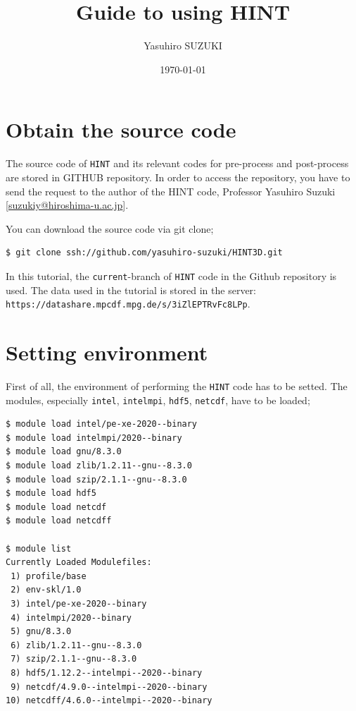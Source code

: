 \documentclass[10pt]{ltxdoc} %
\title{Guide to using HINT}
\author{Yasuhiro SUZUKI}
\date{\today} %
\begin{document}
\maketitle

\section{Obtain the source code}
The source code of \texttt{HINT} and its relevant codes for pre-process and post-process are stored in GITHUB repository. In order to access the repository, you have to send the request to the author of the HINT code, Professor Yasuhiro Suzuki [\href{mailto:suzukiy@hiroshima-u.ac.jp}{suzukiy@hiroshima-u.ac.jp}].

\vspace{5mm}
You can download the source code via git clone;
\begin{verbatim}
$ git clone ssh://github.com/yasuhiro-suzuki/HINT3D.git
\end{verbatim}
\vspace{5mm}

In this tutorial, the \texttt{current}-branch of \texttt{HINT} code in the Github repository is used. 
The data used in the tutorial is stored in the server: \texttt{https://datashare.mpcdf.mpg.de/s/3iZlEPTRvFc8LPp}.

\section{Setting environment}
First of all, the environment of performing the \texttt{HINT} code has to be setted. 
The modules, especially \texttt{intel}, \texttt{intelmpi}, \texttt{hdf5}, \texttt{netcdf}, have to be loaded; 
\vspace{3mm}
\begin{verbatim}
$ module load intel/pe-xe-2020--binary
$ module load intelmpi/2020--binary
$ module load gnu/8.3.0
$ module load zlib/1.2.11--gnu--8.3.0
$ module load szip/2.1.1--gnu--8.3.0
$ module load hdf5
$ module load netcdf
$ module load netcdff

$ module list
Currently Loaded Modulefiles:
 1) profile/base                          
 2) env-skl/1.0                            
 3) intel/pe-xe-2020--binary               
 4) intelmpi/2020--binary                  
 5) gnu/8.3.0                              
 6) zlib/1.2.11--gnu--8.3.0                
 7) szip/2.1.1--gnu--8.3.0                 
 8) hdf5/1.12.2--intelmpi--2020--binary    
 9) netcdf/4.9.0--intelmpi--2020--binary   
10) netcdff/4.6.0--intelmpi--2020--binary  
\end{verbatim}
\vspace{3mm}
\end{document}
